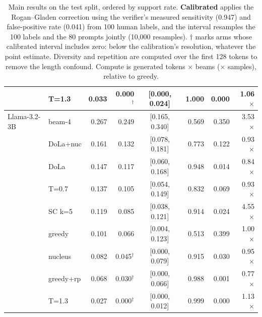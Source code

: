 \begin{table}[t]
\begin{tabular}{ll rrc rr r}
     & T=1.3 & 0.033 & 0.000$^{\dagger}$ & [0.000, 0.024] & 1.000 & 0.000 & 1.06$\times$ \\
    \midrule
    Llama-3.2-3B & beam-4 & 0.267 & 0.249 & [0.165, 0.340] & 0.569 & 0.350 & 3.53$\times$ \\
     & DoLa+nuc & 0.161 & 0.132 & [0.078, 0.181] & 0.773 & 0.122 & 0.93$\times$ \\
     & DoLa & 0.147 & 0.117 & [0.060, 0.168] & 0.948 & 0.014 & 0.84$\times$ \\
     & T=0.7 & 0.137 & 0.105 & [0.054, 0.149] & 0.832 & 0.069 & 0.93$\times$ \\
     & SC k=5 & 0.119 & 0.085 & [0.038, 0.121] & 0.914 & 0.024 & 4.55$\times$ \\
     & greedy & 0.101 & 0.066 & [0.004, 0.123] & 0.513 & 0.399 & 1.00$\times$ \\
     & nucleus & 0.082 & 0.045$^{\dagger}$ & [0.000, 0.079] & 0.915 & 0.030 & 0.95$\times$ \\
     & greedy+rp & 0.068 & 0.030$^{\dagger}$ & [0.000, 0.066] & 0.988 & 0.001 & 0.77$\times$ \\
     & T=1.3 & 0.027 & 0.000$^{\dagger}$ & [0.000, 0.012] & 0.999 & 0.000 & 1.13$\times$ \\
    \bottomrule
  \end{tabular}
  \caption{Main results on the test split, ordered by support rate. \textbf{Calibrated} applies the Rogan--Gladen correction using the verifier's measured sensitivity (0.947) and false-positive rate (0.041) from 100 human labels, and the interval resamples the 100 labels and the 80 prompts jointly (10,000 resamples). $\dagger$ marks arms whose calibrated interval includes zero: below the calibration's resolution, whatever the point estimate. Diversity and repetition are computed over the first 128 tokens to remove the length confound. Compute is generated tokens $\times$ beams ($\times$ samples), relative to greedy.}
  \label{tab:main}
\end{table}
